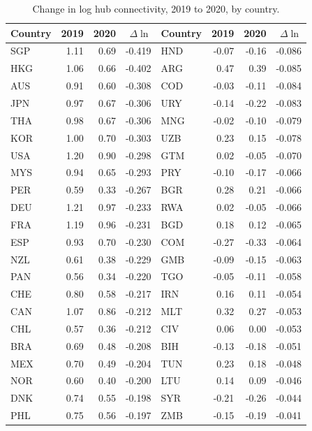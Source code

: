 \begin{table}[H]\centering\caption{Change in log hub connectivity, 2019 to 2020, by country.}\label{tab:a_covid}
\begin{threeparttable}\scriptsize\begin{tabular}{lrrr@{\hskip 2em}lrrr}
\toprule
Country & 2019 & 2020 & $\Delta\ln$ & Country & 2019 & 2020 & $\Delta\ln$ \\
\midrule
SGP & 1.11 & 0.69 & -0.419 & HND & -0.07 & -0.16 & -0.086 \\
HKG & 1.06 & 0.66 & -0.402 & ARG & 0.47 & 0.39 & -0.085 \\
AUS & 0.91 & 0.60 & -0.308 & COD & -0.03 & -0.11 & -0.084 \\
JPN & 0.97 & 0.67 & -0.306 & URY & -0.14 & -0.22 & -0.083 \\
THA & 0.98 & 0.67 & -0.306 & MNG & -0.02 & -0.10 & -0.079 \\
KOR & 1.00 & 0.70 & -0.303 & UZB & 0.23 & 0.15 & -0.078 \\
USA & 1.20 & 0.90 & -0.298 & GTM & 0.02 & -0.05 & -0.070 \\
MYS & 0.94 & 0.65 & -0.293 & PRY & -0.10 & -0.17 & -0.066 \\
PER & 0.59 & 0.33 & -0.267 & BGR & 0.28 & 0.21 & -0.066 \\
DEU & 1.21 & 0.97 & -0.233 & RWA & 0.02 & -0.05 & -0.066 \\
FRA & 1.19 & 0.96 & -0.231 & BGD & 0.18 & 0.12 & -0.065 \\
ESP & 0.93 & 0.70 & -0.230 & COM & -0.27 & -0.33 & -0.064 \\
NZL & 0.61 & 0.38 & -0.229 & GMB & -0.09 & -0.15 & -0.063 \\
PAN & 0.56 & 0.34 & -0.220 & TGO & -0.05 & -0.11 & -0.058 \\
CHE & 0.80 & 0.58 & -0.217 & IRN & 0.16 & 0.11 & -0.054 \\
CAN & 1.07 & 0.86 & -0.212 & MLT & 0.32 & 0.27 & -0.053 \\
CHL & 0.57 & 0.36 & -0.212 & CIV & 0.06 & 0.00 & -0.053 \\
BRA & 0.69 & 0.48 & -0.208 & BIH & -0.13 & -0.18 & -0.051 \\
MEX & 0.70 & 0.49 & -0.204 & TUN & 0.23 & 0.18 & -0.048 \\
NOR & 0.60 & 0.40 & -0.200 & LTU & 0.14 & 0.09 & -0.046 \\
DNK & 0.74 & 0.55 & -0.198 & SYR & -0.21 & -0.26 & -0.044 \\
PHL & 0.75 & 0.56 & -0.197 & ZMB & -0.15 & -0.19 & -0.041 \\

\end{tabular}
\end{threeparttable}
\end{table}
